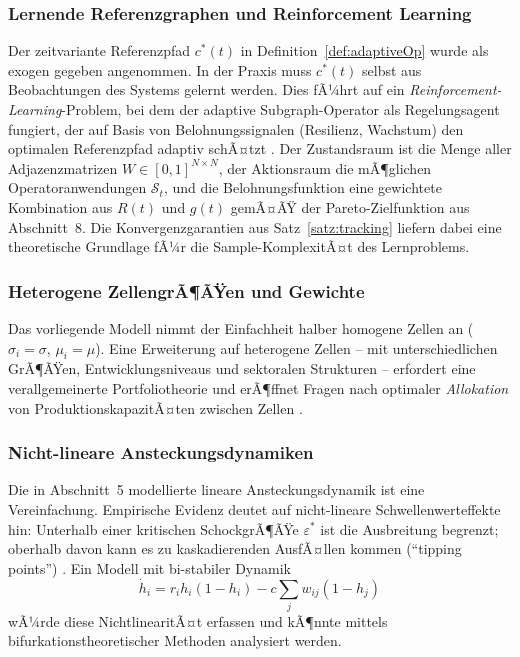 ﻿\documentclass[a4paper,12pt]{article}
\theoremstyle{definition}
\begin{document}
\subsubsection{Lernende Referenzgraphen und Reinforcement Learning}

Der zeitvariante Referenzpfad $c^*(t)$ in Definition~\ref{def:adaptiveOp} wurde
als exogen gegeben angenommen. In der Praxis muss $c^*(t)$ selbst aus Beobachtungen
des Systems gelernt werden. Dies fÃ¼hrt auf ein \emph{Reinforcement-Learning}-Problem,
bei dem der adaptive Subgraph-Operator als Regelungsagent fungiert, der auf Basis
von Belohnungssignalen (Resilienz, Wachstum) den optimalen Referenzpfad adaptiv
schÃ¤tzt \citep{sutton2018reinforcement}. Der Zustandsraum ist die Menge aller
Adjazenzmatrizen $W \in [0,1]^{N \times N}$, der Aktionsraum die mÃ¶glichen
Operatoranwendungen $\mathcal{S}_t$, und die Belohnungsfunktion eine gewichtete
Kombination aus $R(t)$ und $g(t)$ gemÃ¤ÃŸ der Pareto-Zielfunktion aus Abschnitt~8.
Die Konvergenzgarantien aus Satz~\ref{satz:tracking} liefern dabei eine
theoretische Grundlage fÃ¼r die Sample-KomplexitÃ¤t des Lernproblems.

\subsubsection{Heterogene ZellengrÃ¶ÃŸen und Gewichte}

Das vorliegende Modell nimmt der Einfachheit halber homogene Zellen an ($\sigma_i = \sigma$,
$\mu_i = \mu$). Eine Erweiterung auf heterogene Zellen -- mit unterschiedlichen GrÃ¶ÃŸen,
Entwicklungsniveaus und sektoralen Strukturen -- erfordert eine verallgemeinerte
Portfoliotheorie und erÃ¶ffnet Fragen nach optimaler \emph{Allokation} von ProduktionskapazitÃ¤ten
zwischen Zellen \citep{markowitz1952portfolio}.

\subsubsection{Nicht-lineare Ansteckungsdynamiken}

Die in Abschnitt~5 modellierte lineare Ansteckungsdynamik ist eine Vereinfachung.
Empirische Evidenz deutet auf nicht-lineare Schwellenwerteffekte hin: Unterhalb einer
kritischen SchockgrÃ¶ÃŸe $\varepsilon^*$ ist die Ausbreitung begrenzt; oberhalb davon
kann es zu kaskadierenden AusfÃ¤llen kommen (``tipping points'') \citep{may2008complex}.
Ein Modell mit bi-stabiler Dynamik
\[
    \dot{h}_i = r_i h_i (1-h_i) - c \sum_j w_{ij}(1-h_j)
\]
wÃ¼rde diese NichtlinearitÃ¤t erfassen und kÃ¶nnte mittels bifurkationstheoretischer Methoden
analysiert werden.
\end{document}
